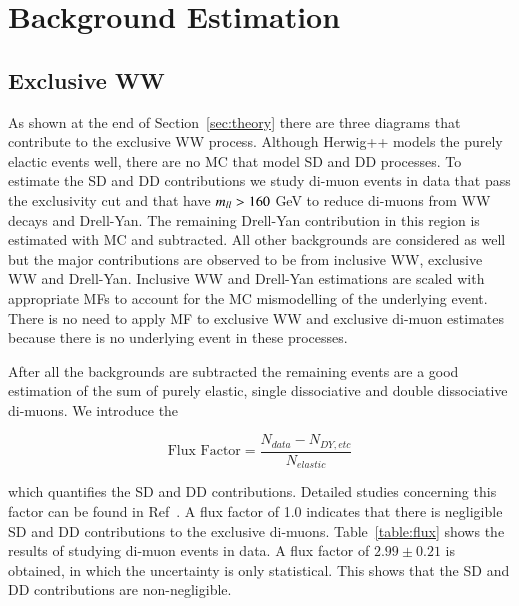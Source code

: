 \clearpage
\section{Background Estimation}
\label{sec:bkgEst}

\subsection{Exclusive WW}
\par As shown at the end of Section~\ref{sec:theory} there are three diagrams that contribute 
to the exclusive WW process. Although Herwig++ models the purely elactic events well, there are 
no MC that model SD and DD processes. To estimate the SD and DD contributions we study di-muon
events in data that pass the exclusivity cut and that have $m_{ll}>160$ GeV to reduce di-muons 
from WW decays and Drell-Yan. The remaining Drell-Yan contribution in this region is estimated 
with MC and subtracted. All other backgrounds are considered as well but the major contributions are observed 
to be from inclusive WW, exclusive WW and Drell-Yan. Inclusive WW and Drell-Yan estimations 
are scaled with appropriate MFs to account for the MC mismodelling of the underlying event.
There is no need to apply MF to exclusive WW and exclusive di-muon estimates because there 
is no underlying event in these processes. 

\par After all the backgrounds are subtracted the remaining events are a good estimation of 
the sum of purely elastic, single dissociative and double dissociative di-muons. We introduce 
the

\begin{equation}
\mbox{Flux Factor} = \frac{N_{data} - N_{DY,etc}}{N_{elastic}}
\end{equation}

which quantifies the SD and DD contributions. Detailed studies concerning this factor can 
be found in Ref~\cite{CMSmumu}. A flux factor of 1.0 indicates that there is negligible SD 
and DD contributions to the exclusive di-muons. Table~\ref{table:flux} shows the results 
of studying di-muon events in data. A flux factor of $2.99\pm0.21$ is obtained, in which the 
uncertainty is only statistical. This shows that the SD and DD contributions are non-negligible.  

